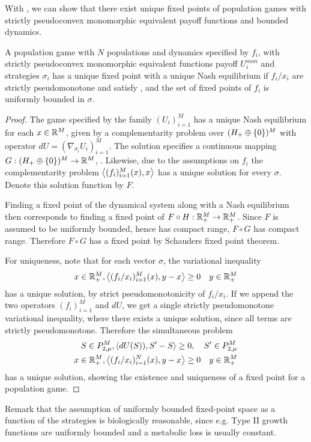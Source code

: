 With , we can show that there exist unique fixed points of population games with strictly pseudoconvex monomorphic equivalent payoff functions and bounded dynamics.
\begin{theorem}
  \label{thm:pop_game_exists_unique}
  A population game with $N$ populations and dynamics specified by $f_i$, with strictly pseudoconvex monomorphic equivalent functions payoff $U^{mon}_i$ and strategies $\sigma_i$ has a unique fixed point with a unique Nash equilibrium if $f_i/x_i$ are strictly pseudomonotone and satisfy , and the set of fixed points of $f_i$ is uniformly bounded in $\sigma$.
\end{theorem}
\begin{proof}
  The game specified by the family $(U_i)_{i=1}^M$ has a unique Nash equilibrium for each $x\in \mathbb{R}^M$, given by a complementarity problem over $(H_+ \oplus \{0\})^M$ with operator $dU = (\nabla_{\sigma_i} U_i)_{i=1}^M$. The solution specifies a continuous mapping $G: (H_+ \oplus \{0\})^M \to \mathbb{R}^M$, \cite[Theorem 4.2]{barbagallo2009continuity}. Likewise, due to the assumptions on $f_i$ the complementarity problem $\left \langle (f_i)_{i=1}^M(x),x \right \rangle$ has a unique solution for every $\sigma$. Denote this solution function by $F$.

  Finding a fixed point of the dynamical system along with a Nash equilibrium then corresponds to finding a fixed point of $F\circ H: \mathbb{R}_+^M \to \mathbb{R}_+^M$. Since $F$ is assumed to be uniformly bounded, hence has compact range, $F\circ G$ has compact range. Therefore $F\circ G$ has a fixed point by Schauders fixed point theorem.

  For uniqueness, note that for each vector $\sigma$, the variational inequality
  \begin{equation}
    x \in \mathbb{R}_+^M, \left \langle (f_i/x_i)_{i=1}^M(x),y-x \right \rangle\geq 0 \quad y\in \mathbb{R}_+^M
  \end{equation}
  has a unique solution, by strict pseudomonotonicity of $f_i/x_i$. If we append the two operators $(f_i)_{i=1}^M$ and $dU$, we get a single strictly pseudomonotone variational inequality, where there exists a unique solution, since all terms are strictly pseudomonotone.
 Therefore the simultaneous problem
\begin{equation}
  \begin{split}
  S\in P_{2,\mu}^M, \left \langle dU(S)),S'-S \right \rangle \geq 0, \quad S' \in P_{2,\mu}^M \\
  x \in \mathbb{R}_+^M, \left \langle (f_i/x_i)_{i=1}^N(x),y-x \right \rangle\geq 0 \quad y\in \mathbb{R}_+^M
\end{split}
\end{equation}
  has a unique solution, showing the existence and uniqueness of a fixed point for a population game.
\end{proof}
Remark that the assumption of uniformly bounded fixed-point space as a function of the strategies is biologically reasonable, since e.g. Type II growth functions are uniformly bounded and a metabolic loss is usually constant.

